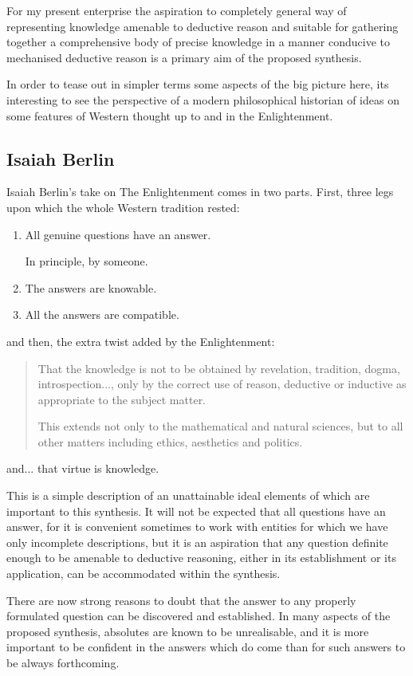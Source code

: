 \documentclass[10pt,titlepage]{book}
\begin{document}
For my present enterprise the aspiration to completely general way of representing knowledge amenable to deductive reason and suitable for gathering together a comprehensive body of precise knowledge in a manner conducive to mechanised deductive reason is a primary aim of the proposed synthesis.

In order to tease out in simpler terms some aspects of the big picture here, its interesting to see the perspective of a modern philosophical historian of ideas on some features of Western thought up to and in the Enlightenment.

\subsection{Isaiah Berlin}

Isaiah Berlin's take on The Enlightenment\cite{berlinRR} comes in two parts.
First, three legs upon which the whole Western tradition rested:
\begin{enumerate}
  \item All genuine questions have an answer.

    In principle, by someone.
\item  The answers are knowable.
\item All the answers are compatible.
\end{enumerate}

and then, the extra twist added by the Enlightenment:
\begin{quotation}
That the knowledge is not to be obtained by revelation, tradition, dogma, introspection..., only by the correct use of reason, deductive or inductive as appropriate to the subject matter.

This extends not only to the mathematical and natural sciences, but to all other matters including ethics, aesthetics and politics.
\end{quotation}
and... that virtue is knowledge.

This is a simple description of an unattainable ideal elements of which are important to this synthesis.
It will not be expected that all questions have an answer, for it is convenient sometimes to work with entities for which we have only incomplete descriptions, but it is an aspiration that any question definite enough to be amenable to deductive reasoning, either in its establishment or its application, can be accommodated within the synthesis.

There are now strong reasons to doubt that the answer to any properly formulated question can be discovered and established.
In many aspects of the proposed synthesis, absolutes are known to be unrealisable, and it is more important to be confident in the answers which do come than for such answers to be always forthcoming.
\end{document}
